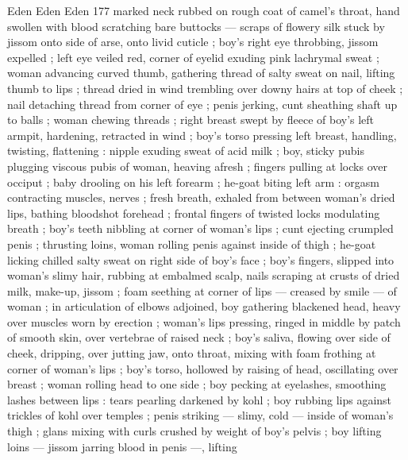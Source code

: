Eden Eden Eden 177
marked neck rubbed on rough coat of camel's throat, hand swollen
with blood scratching bare buttocks — scraps of flowery silk stuck
by jissom onto side of arse, onto livid cuticle ; boy's right eye
throbbing, jissom expelled ; left eye veiled red, corner of eyelid
exuding pink lachrymal sweat ; woman advancing curved thumb,
gathering thread of salty sweat on nail, lifting thumb to lips ; thread
dried in wind trembling over downy hairs at top of cheek ; nail
detaching thread from corner of eye ; penis jerking, cunt sheathing
shaft up to balls ; woman chewing threads ; right breast swept by
fleece of boy's left armpit, hardening, retracted in wind ; boy's torso
pressing left breast, handling, twisting, flattening : nipple exuding
sweat of acid milk ; boy, sticky pubis plugging viscous pubis of
woman, heaving afresh ; fingers pulling at locks over occiput ; baby
drooling on his left forearm ; he-goat biting left arm : orgasm
contracting muscles, nerves ; fresh breath, exhaled from between
woman's dried lips, bathing bloodshot forehead ; frontal fingers of
twisted locks modulating breath ; boy's teeth nibbling at corner of
woman's lips ; cunt ejecting crumpled penis ; thrusting loins, woman
rolling penis against inside of thigh ; he-goat licking chilled salty
sweat on right side of boy's face ; boy's fingers, slipped into
woman's slimy hair, rubbing at embalmed scalp, nails scraping at
crusts of dried milk, make-up, jissom ; foam seething at corner of
lips — creased by smile — of woman ; in articulation of elbows
adjoined, boy gathering blackened head, heavy over muscles worn
by erection ; woman's lips pressing, ringed in middle by patch of
smooth skin, over vertebrae of raised neck ; boy's saliva, flowing
over side of cheek, dripping, over jutting jaw, onto throat, mixing with
foam frothing at corner of woman's lips ; boy's torso, hollowed by
raising of head, oscillating over breast ; woman rolling head to one
side ; boy pecking at eyelashes, smoothing lashes between lips :
tears pearling darkened by kohl ; boy rubbing lips against trickles of
kohl over temples ; penis striking — slimy, cold — inside of
woman's thigh ; glans mixing with curls crushed by weight of boy’s
pelvis ; boy lifting loins — jissom jarring blood in penis —, lifting

